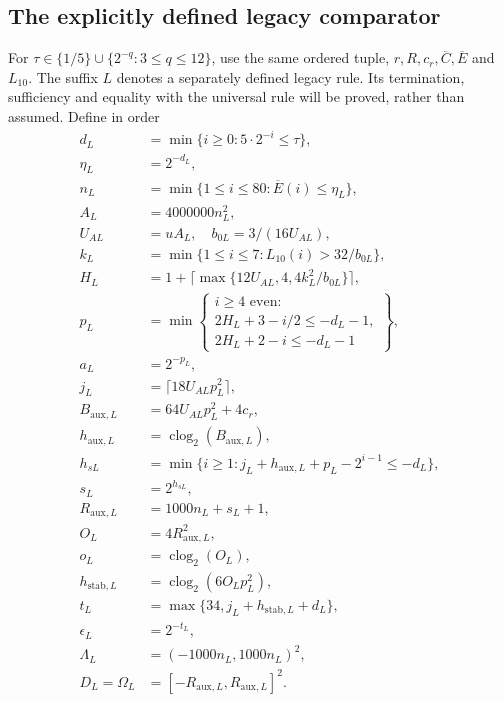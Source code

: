 \documentclass[11pt]{article}
\theoremstyle{plain}
\theoremstyle{definition}
\theoremstyle{remark}
\begin{document}
\subsection{The explicitly defined legacy comparator}
For $\tau\in\{1/5\}\cup\{2^{-q}:3\le q\le12\}$, use the same ordered
tuple, $r,R,c_r,\overline C,\overline E$ and $L_{10}$. The suffix $L$
denotes a separately defined legacy rule. Its termination, sufficiency
and equality with the universal rule will be proved, rather than assumed.
Define in order
\begin{align*}
 d_L&=\min\{i\ge0:5\cdot2^{-i}\le\tau\},\\
 \eta_L&=2^{-d_L},\\
 n_L&=\min\{1\le i\le80:\overline E(i)\le\eta_L\},\\
 A_L&=4000000n_L^2,\\
 U_{AL}&=uA_L,\quad b_{0L}=3/(16U_{AL}),\\
 k_L&=\min\{1\le i\le7:L_{10}(i)>32/b_{0L}\},\\
 H_L&=1+\lceil\max\{12U_{AL},4,4k_L^2/b_{0L}\}\rceil,\\
 p_L&=\min\left\{\begin{array}{l}i\ge4\text{ even}:\\
 2H_L+3-i/2\le-d_L-1,\\
 2H_L+2-i\le-d_L-1\end{array}\right\},
 \\
 a_L&=2^{-p_L},\\
 j_L&=\lceil18U_{AL}p_L^2\rceil,\\
 B_{\mathrm{aux},L}&=64U_{AL}p_L^2+4c_r,\\
 h_{\mathrm{aux},L}&=\operatorname{clog}_2(B_{\mathrm{aux},L}),\\
 h_{sL}&=\min\{i\ge1:j_L+h_{\mathrm{aux},L}+p_L-2^{i-1}\le-d_L\},\\
 s_L&=2^{h_{sL}},\\
 R_{\mathrm{aux},L}&=1000n_L+s_L+1,\\
 O_L&=4R_{\mathrm{aux},L}^2,\\
 o_L&=\operatorname{clog}_2(O_L),\\
 h_{\mathrm{stab},L}&=\operatorname{clog}_2(6O_Lp_L^2),\\
 t_L&=\max\{34,j_L+h_{\mathrm{stab},L}+d_L\},\\
 \epsilon_L&=2^{-t_L},\\
 \Lambda_L&=(-1000n_L,1000n_L)^2,\\
 D_L=\Omega_L&=[-R_{\mathrm{aux},L},R_{\mathrm{aux},L}]^2.
\end{align*}
\end{document}
